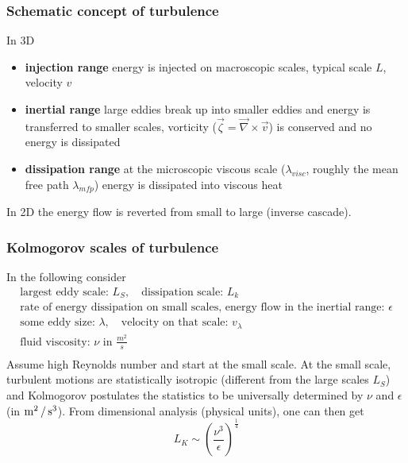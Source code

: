 \subsubsection{Schematic concept of turbulence}
In 3D
\begin{itemize}
    \item \textbf{injection range} energy is injected on macroscopic scales, typical scale $L$, velocity $v$
    \item \textbf{inertial range} large eddies break up into smaller eddies and energy is transferred to smaller scales, vorticity ($\vec{\zeta} = \vec{\nabla}\times \vec{v}$) is conserved and no energy is dissipated
    \item \textbf{dissipation range} at the microscopic viscous scale ($\lambda_{visc}$, roughly the mean free path $\lambda_{mfp}$) energy is dissipated into viscous heat
\end{itemize}
In 2D the energy flow is reverted from small to large (inverse cascade).

\subsubsection{Kolmogorov scales of turbulence}
In the following consider
\begin{equation}
    \begin{gathered}
        \text{largest eddy scale: } L_S, \quad \text{dissipation scale: } L_k \\
        \text{rate of energy dissipation on small scales, energy flow in the inertial range: } \epsilon \\
        \text{some eddy size: } \lambda, \quad \text{velocity on that scale: } v_\lambda \\
        \text{fluid viscosity: } \nu \text{ in } \frac{m^2}{s} \\
    \end{gathered}
\end{equation}
Assume high Reynolds number and start at the small scale. At the small scale, turbulent motions are statistically
isotropic (different from the large scales $L_S$) and Kolmogorov postulates the statistics to be universally
determined by $\nu$ and $\epsilon$ (in $\operatorname{m}^2 / \operatorname{s}^3$). From dimensional analysis (physical units), one can then
get
\begin{equation}
    L_K \sim \left( \frac{\nu^3}{\epsilon} \right)^{\frac{1}{4}}
\end{equation}

